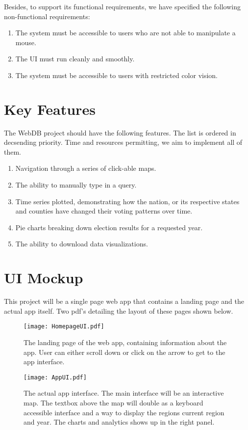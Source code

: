 \documentclass[12pt]{article}
\begin{document}
Besides, to support its functional requirements, we have specified the following non-functional requirements:
\begin{enumerate}
 \item The system must be accessible to users who are not able to manipulate a mouse.
 \item The UI must run cleanly and smoothly.
 \item The system must be accessible to users with restricted color vision.
\end{enumerate}

\section{Key Features}
The WebDB project should have the following features. The list is ordered in decsending priority. Time and resources
permitting, we aim to implement all of them.
\begin{enumerate}
 \item Navigation through a series of click-able maps.
 \item The ability to manually type in a query.
 \item Time series plotted, demonstrating how the nation, or its respective states and counties have changed their voting patterns over time.
 \item Pie charts breaking down election results for a requested year. 
 \item The ability to download data visualizations.
\end{enumerate}

\section{UI Mockup}
This project will be a single page web app that contains a landing page and the actual app itself. Two pdf's detailing the layout of these pages shown below.
\hspace*{-1.5in}
\begin{figure}[p]
  \centering
 \texttt{[image: HomepageUI.pdf]}
 \caption{The landing page of the web app, containing information about the app. User can either scroll down or click on the arrow to get to the app interface.}
\end{figure}
\begin{figure}[p]
  \centering
 \texttt{[image: AppUI.pdf]}
 \caption{The actual app interface. The main interface will be an interactive map. The textbox above the map will double as a keyboard accessible interface and a way to display the regions current region and year. 
 The charts and analytics shows up in the right panel.}
\end{figure}
\end{document}
